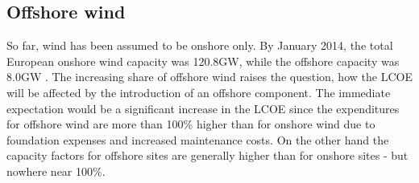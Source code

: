 \documentclass[a4paper, 5p, sort&compress]{elsarticle}%
\begin{document}



\subsection{Offshore wind}
\label{sec:offshore-wind}

So far, wind has been assumed to be onshore only. By January 2014, the
total European onshore wind capacity was 120.8GW, while the offshore
capacity was 8.0GW \cite{EWEA}. %
The increasing share of offshore wind raises the question, how the
LCOE will be affected by the introduction of an offshore
component. The immediate expectation would be a significant increase
in the LCOE since the expenditures for offshore wind are more than
100\% higher than for onshore wind due to foundation expenses and
increased maintenance costs. On the other hand the capacity factors
for offshore sites are generally higher than for onshore sites - but
nowhere near 100\%.
\end{document}
